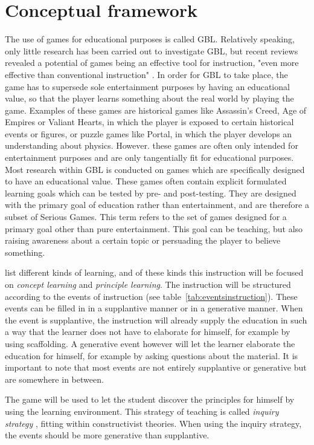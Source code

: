 \documentclass[12pt]{report} %
\begin{document}
\section{Conceptual framework}

The use of games for educational purposes is called GBL. Relatively speaking, only little research has been carried out to investigate GBL, but recent reviews revealed a potential of games being an effective tool for instruction, "even more effective than conventional instruction" \cite[p.~1]{wouters}. In order for GBL to take place, the game has to supersede sole entertainment purposes by having an educational value, so that the player learns something about the real world by playing the game. Examples of these games are historical games like Assassin's Creed, Age of Empires or Valiant Hearts, in which the player is exposed to certain historical events or figures, or puzzle games like Portal, in which the player develops an understanding about physics. However. these games are often only intended for entertainment purposes and are only tangentially fit for educational purposes. Most research within GBL is conducted on games which are specifically designed to have an educational value. These games often contain explicit formulated learning goals which can be tested by pre- and post-testing. They are designed with the primary goal of education rather than entertainment, and are therefore a subset of Serious Games. This term refers to the set of games designed for a primary goal other than pure entertainment. This goal can be teaching, but also raising awareness about a certain topic or persuading the player to believe something.

 list different kinds of learning, and of these kinds this instruction will be focused on \emph{concept learning} and \emph{principle learning}. The instruction will be structured according to the events of instruction \cite{smithragan} (see table~\ref{tab:eventsinstruction}). These events can be filled in in a supplantive manner or in a generative manner. When the event is supplantive, the instruction will already supply the education in such a way that the learner does not have to elaborate for himself, for example by using scaffolding. A generative event however will let the learner elaborate the education for himself, for example by asking questions about the material. It is important to note that most events are not entirely supplantive or generative but are somewhere in between.

The game will be used to let the student discover the principles for himself by using the learning environment. This strategy of teaching is called \emph{inquiry strategy} \cite{smithragan}, fitting within constructivist theories. When using the inquiry strategy, the events should be more generative than supplantive.
\end{document}

